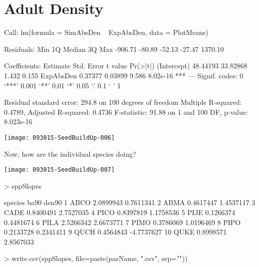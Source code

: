\documentclass{article}
\begin{document}
\newpage

\section{Adult Density}
\begin{Schunk}
\begin{Soutput}
Call:
lm(formula = SimAbsDen ~ ExpAbsDen, data = PlotMeans)

Residuals:
    Min      1Q  Median      3Q     Max 
-906.71  -80.89  -52.13  -27.47 1370.10 

Coefficients:
            Estimate Std. Error t value Pr(>|t|)    
(Intercept) 48.44193   33.82868   1.432    0.155    
ExpAbsDen    0.37377    0.03899   9.586 8.02e-16 ***
---
Signif. codes:  0 ‘***’ 0.001 ‘**’ 0.01 ‘*’ 0.05 ‘.’ 0.1 ‘ ’ 1

Residual standard error: 294.8 on 100 degrees of freedom
Multiple R-squared:  0.4789,	Adjusted R-squared:  0.4736 
F-statistic: 91.88 on 1 and 100 DF,  p-value: 8.023e-16
\end{Soutput}
\end{Schunk}
\texttt{[image: 093015-SeedBuildUp-006]}

Now, how are the individual species doing?

\texttt{[image: 093015-SeedBuildUp-007]}
\begin{Schunk}
\begin{Sinput}
>   sppSlopes
\end{Sinput}
\begin{Soutput}
   species      ba90      den90
1     ABCO 2.0899943  0.7611341
2     ABMA 0.4617447  1.4537117
3     CADE 0.8400491  2.7527035
4     PICO 0.8397819  1.1758536
5     PIJE 0.1266374  0.4481674
6     PILA 2.5266342  2.6673771
7     PIMO 0.3786069  1.0196469
8     PIPO 0.2133728  0.2341411
9     QUCH 0.4564843 -4.7737627
10    QUKE 0.8998571  2.8567033
\end{Soutput}
\begin{Sinput}
>     write.csv(sppSlopes, file=paste(parName, ".csv", sep=""))
\end{Sinput}
\end{Schunk}
\end{document}
